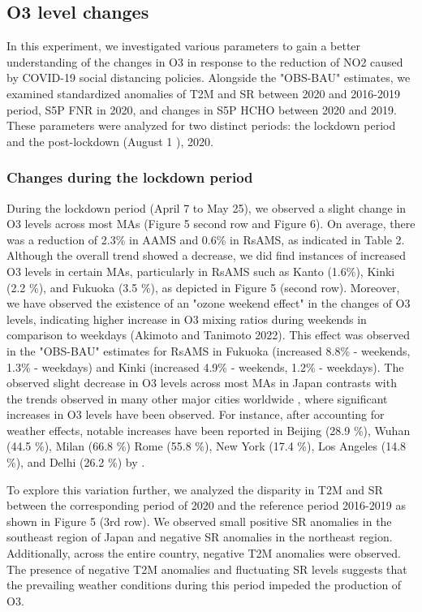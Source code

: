 \subsection{O3 level changes}
In this experiment, we investigated various parameters to gain a better understanding of the changes in O3 in response to the reduction of NO2 caused by COVID-19 social distancing policies. Alongside the "OBS-BAU" estimates, we examined standardized anomalies of T2M and SR between 2020 and 2016-2019 period, S5P FNR in 2020, and changes in S5P HCHO between 2020 and 2019. These parameters were analyzed for two distinct periods: the lockdown period and the post-lockdown (August 1 ), 2020. \par

\subsubsection*{Changes during the lockdown period}
During the lockdown period (April 7 to May 25), we observed a slight change in O3 levels across most MAs (Figure 5 second row and Figure 6). On average, there was a reduction of 2.3\% in AAMS and 0.6\% in RsAMS, as indicated in Table 2. Although the overall trend showed a decrease, we did find instances of increased O3 levels in certain MAs, particularly in RsAMS such as Kanto (1.6\%), Kinki (2.2 \%), and Fukuoka (3.5 \%), as depicted in Figure 5 (second row). Moreover, we have observed the existence of an "ozone weekend effect" in the changes of O3 levels, indicating higher increase in O3 mixing ratios during weekends in comparison to weekdays (Akimoto and Tanimoto 2022). This effect was observed in the "OBS-BAU" estimates for RsAMS in Fukuoka (increased 8.8\% - weekends, 1.3\% - weekdays) and Kinki (increased 4.9\% - weekends, 1.2\% - weekdays).
The observed slight decrease in O3 levels across most MAs in Japan contrasts with the trends observed in many other major cities worldwide \citep{shi2021abrupt,grange2021covid}, where significant increases in O3 levels have been observed. For instance, after accounting for weather effects, notable increases have been reported in Beijing (28.9 \%), Wuhan (44.5 \%), Milan (66.8 \%) Rome (55.8 \%), New York (17.4 \%), Los Angeles (14.8 \%), and Delhi (26.2 \%) by \citep{shi2021abrupt}.\par
To explore this variation further, we analyzed the disparity in T2M and SR between the corresponding period of 2020 and the reference period 2016-2019 as shown in Figure 5 (3rd row). We observed small positive SR anomalies in the southeast region of Japan and negative SR anomalies in the northeast region. Additionally, across the entire country, negative T2M anomalies were observed. The presence of negative T2M anomalies and fluctuating SR levels suggests that the prevailing weather conditions during this period impeded the production of O3. \par

